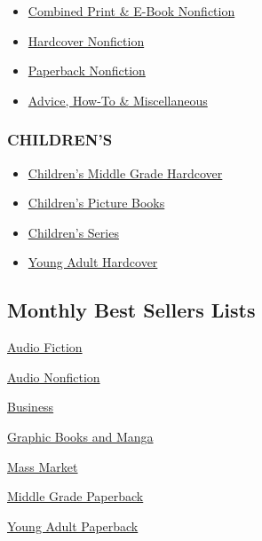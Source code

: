 \begin{itemize}
\tightlist
\item
  \href{/books/best-sellers/combined-print-and-e-book-nonfiction/}{Combined
  Print \& E-Book Nonfiction}
\item
  \href{/books/best-sellers/hardcover-nonfiction/}{Hardcover Nonfiction}
\item
  \href{/books/best-sellers/paperback-nonfiction/}{Paperback Nonfiction}
\item
  \href{/books/best-sellers/advice-how-to-and-miscellaneous/}{Advice,
  How-To \& Miscellaneous}
\end{itemize}

\hypertarget{childrens}{%
\subsubsection{CHILDREN'S}\label{childrens}}

\begin{itemize}
\tightlist
\item
  \href{/books/best-sellers/childrens-middle-grade-hardcover/}{Children's
  Middle Grade Hardcover}
\item
  \href{/books/best-sellers/picture-books/}{Children's Picture Books}
\item
  \href{/books/best-sellers/series-books/}{Children's Series}
\item
  \href{/books/best-sellers/young-adult-hardcover/}{Young Adult
  Hardcover}
\end{itemize}

\hypertarget{monthly-best-sellers-lists}{%
\subsection{Monthly Best Sellers
Lists}\label{monthly-best-sellers-lists}}

\href{/books/best-sellers/audio-fiction/}{Audio Fiction}

\href{/books/best-sellers/audio-nonfiction/}{Audio Nonfiction}

\href{/books/best-sellers/business-books/}{Business}

\href{/books/best-sellers/graphic-books-and-manga/}{Graphic Books and
Manga}

\href{/books/best-sellers/mass-market-monthly/}{Mass Market}

\href{/books/best-sellers/middle-grade-paperback-monthly/}{Middle Grade
Paperback}

\href{/books/best-sellers/young-adult-paperback-monthly/}{Young Adult
Paperback}

